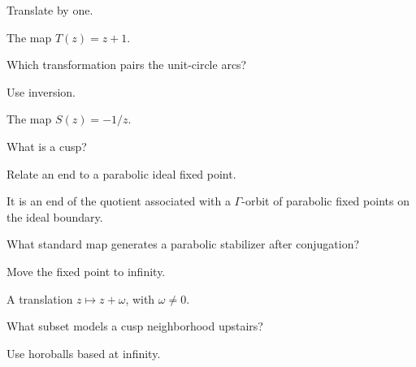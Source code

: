 \begin{hint}
Translate by one.
\end{hint}

\begin{solution}
The map \(T(z)=z+1\).
\end{solution}

\begin{exercise}\label{exr:vii35-14}
Which transformation pairs the unit-circle arcs?
\end{exercise}

\begin{hint}
Use inversion.
\end{hint}

\begin{solution}
The map \(S(z)=-1/z\).
\end{solution}

\begin{exercise}\label{exr:vii35-15}
What is a cusp?
\end{exercise}

\begin{hint}
Relate an end to a parabolic ideal fixed point.
\end{hint}

\begin{solution}
It is an end of the quotient associated with a \(\Gamma\)-orbit of parabolic fixed points on the ideal boundary.
\end{solution}

\begin{exercise}\label{exr:vii35-16}
What standard map generates a parabolic stabilizer after conjugation?
\end{exercise}

\begin{hint}
Move the fixed point to infinity.
\end{hint}

\begin{solution}
A translation \(z\mapsto z+\omega\), with \(\omega\ne0\).
\end{solution}

\begin{exercise}\label{exr:vii35-17}
What subset models a cusp neighborhood upstairs?
\end{exercise}

\begin{hint}
Use horoballs based at infinity.
\end{hint}


